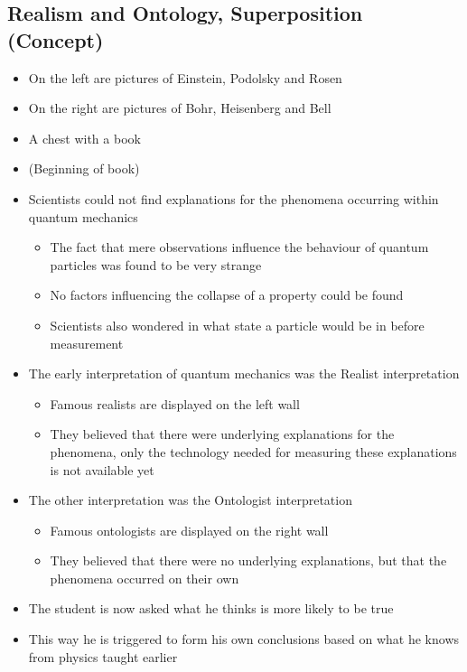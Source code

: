 \documentclass[11pt,twoside]{report} %
\begin{document}
\subsection{Realism and Ontology, Superposition (Concept)}
\begin{itemize}
	\item On the left are pictures of Einstein, Podolsky and Rosen
	\item On the right are pictures of Bohr, Heisenberg and Bell
	\item A chest with a book
	\item (Beginning of book)
	\item Scientists could not find explanations for the phenomena occurring within quantum mechanics
	\begin{itemize}
		\item The fact that mere observations influence the behaviour of quantum particles was found to be very strange
		\item No factors influencing the collapse of a property could be found
		\item Scientists also wondered in what state a particle would be in before measurement
	\end{itemize}
	\item The early interpretation of quantum mechanics was the Realist interpretation
	\begin{itemize}
		\item Famous realists are displayed on the left wall
		\item They believed that there were underlying explanations for the phenomena, only the technology needed for measuring these explanations is not available yet
	\end{itemize}
	\item The other interpretation was the Ontologist interpretation
	\begin{itemize}
		\item Famous ontologists are displayed on the right wall
		\item They believed that there were no underlying explanations, but that the phenomena occurred on their own
	\end{itemize}
	\item The student is now asked what he thinks is more likely to be true
	\item This way he is triggered to form his own conclusions based on what he knows from physics taught earlier
\end{itemize}
\end{document}
